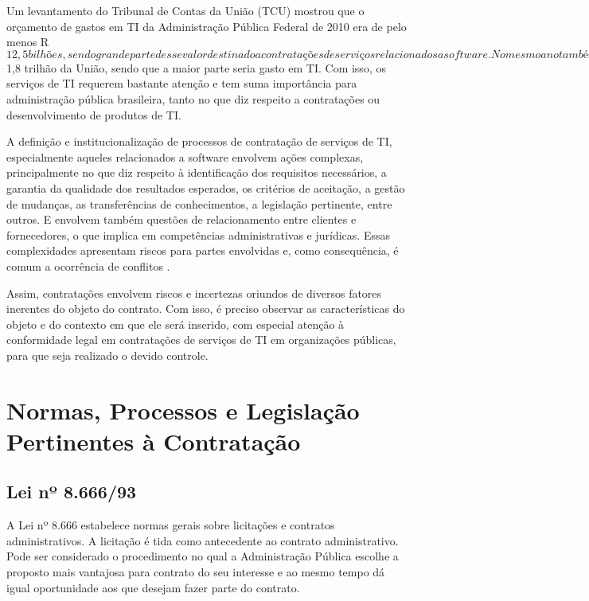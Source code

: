 Um levantamento do Tribunal de Contas da União (TCU) mostrou que o orçamento de gastos em TI da Administração Pública Federal de 2010 era de pelo menos R$ 12,5 bilhões, sendo grande parte desse valor destinado a contratações de serviços relacionados a software. No mesmo ano também era previsto um orçamento de cerca de R$ 1,8 trilhão da União, sendo que a maior parte seria gasto em TI. Com isso, os serviços de TI requerem bastante atenção e tem suma importância para administração pública brasileira, tanto no que diz respeito a contratações ou desenvolvimento de produtos de TI.

A definição e institucionalização de processos de contratação de serviços de TI, especialmente aqueles relacionados a software envolvem ações complexas, principalmente no que diz respeito à identificação dos requisitos necessários, a garantia da qualidade dos resultados esperados, os critérios de aceitação, a gestão de mudanças, as transferências de conhecimentos, a legislação pertinente, entre outros. E envolvem também questões de relacionamento entre clientes e fornecedores, o que implica em competências administrativas e jurídicas. Essas complexidades apresentam riscos para partes envolvidas e, como consequência, é comum a ocorrência de conflitos \cite{cruz2011}.

Assim, contratações envolvem riscos e incertezas oriundos de diversos fatores inerentes do objeto do contrato. Com isso, é preciso observar as características do objeto e do contexto em que ele será inserido, com especial atenção à conformidade legal em contratações de serviços de TI em organizações públicas, para que seja realizado o devido controle.


\section[Normas, Processos e Legislação Pertinentes à Contratação]{Normas, Processos e Legislação Pertinentes à Contratação}

\subsection[Lei nº 8.666/93]{Lei nº 8.666/93}

A Lei nº 8.666 \cite{Lei8666:1993} estabelece normas gerais sobre licitações e contratos administrativos. A licitação é tida como antecedente ao contrato administrativo. Pode ser considerado o procedimento no qual a Administração Pública escolhe a proposto mais vantajosa para contrato do seu interesse e ao mesmo tempo dá igual oportunidade aos que desejam fazer parte do contrato.

